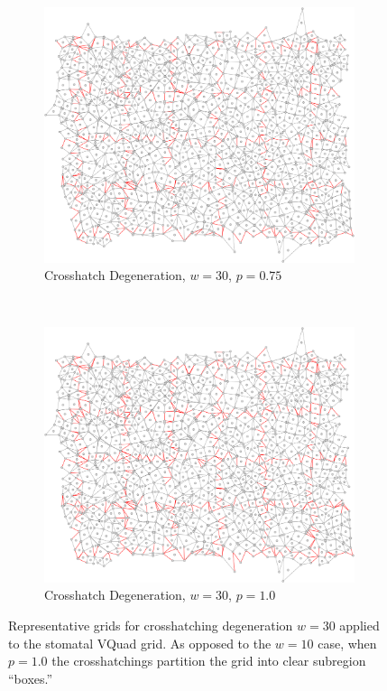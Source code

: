 \documentclass[a4paper,11pt]{article}
\begin{document}
\begin{figure}[htp]
\begin{subfigure}[t]{0.45\textwidth}
  \end{subfigure}

\begin{subfigure}[t]{0.45\textwidth}
  \centering
  \includegraphics[width=\textwidth]{ch6_figs/cross_hatch_p75_w30}
  \caption{Crosshatch Degeneration, $w=30$, $p=0.75$}

  \end{subfigure}
~
\begin{subfigure}[t]{0.45\textwidth}
  \centering
  \includegraphics[width=\textwidth]{ch6_figs/cross_hatch_p100_w30}
  \caption{Crosshatch Degeneration, $w=30$, $p=1.0$}

  \end{subfigure}

\caption[Crosshatch Degeneration, $w=30$]{
  Representative grids for crosshatching degeneration $w=30$ applied to the stomatal VQuad grid. As opposed to the $w=10$ case, when $p=1.0$ the crosshatchings partition the grid into clear subregion ``boxes.''
  }
\label{fig:ch_w30_grid}
\end{figure}
\end{document}
